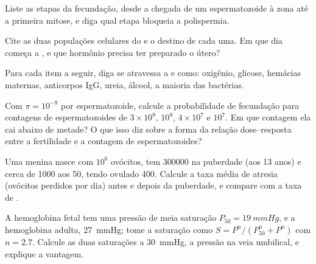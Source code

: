 \begin{exercise}[$\star$]\label{exo:b2:mammal-reproduction:2}
Liste as etapas da fecundação, desde a chegada de um espermatozoide à
zona até a primeira mitose, e diga qual etapa bloqueia a polispermia.
\end{exercise}

\begin{exercise}[$\star$]\label{exo:b2:mammal-reproduction:3}
Cite as duas populações celulares do  e o destino de cada
uma. Em que dia começa a , e que hormônio precisa ter
preparado o útero?
\end{exercise}

\begin{exercise}[$\star$]\label{exo:b2:mammal-reproduction:4}
Para cada item a seguir, diga se atravessa a  e como: oxigênio,
glicose, hemácias maternas, anticorpos IgG, ureia, álcool, a maioria
das bactérias.
\end{exercise}

\begin{exercise}[$\star\star$]\label{exo:b2:mammal-reproduction:5}
Com $\pi = 10^{-8}$ por espermatozoide, calcule a probabilidade de
fecundação para contagens de espermatozoides de $3\times 10^{8}$,
$10^{8}$, $4\times 10^{7}$ e $10^{7}$. Em que contagem ela cai abaixo
de metade? O que isso diz sobre a forma da relação dose--resposta
entre a fertilidade e a contagem de espermatozoides?
\end{exercise}

\begin{exercise}[$\star\star$]\label{exo:b2:mammal-reproduction:6}
Uma menina nasce com $10^{6}$ ovócitos, tem \num{300000} na puberdade
(aos 13 anos) e cerca de \num{1000} aos 50, tendo ovulado \num{400}.
Calcule a taxa média de atresia (ovócitos perdidos por dia) antes e
depois da puberdade, e compare com a taxa de .
\end{exercise}

\begin{exercise}[$\star\star$]\label{exo:b2:mammal-reproduction:7}
A hemoglobina fetal tem uma pressão de meia saturação $P_{50} =
\qty{19}{mmHg}$, e a hemoglobina adulta, \qty{27}{mmHg}; tome a
saturação como $S = P^{n}/(P_{50}^{n} + P^{n})$ com $n = 2.7$. Calcule
as duas saturações a \qty{30}{mmHg}, a pressão na veia umbilical, e
explique a vantagem.
\end{exercise}

